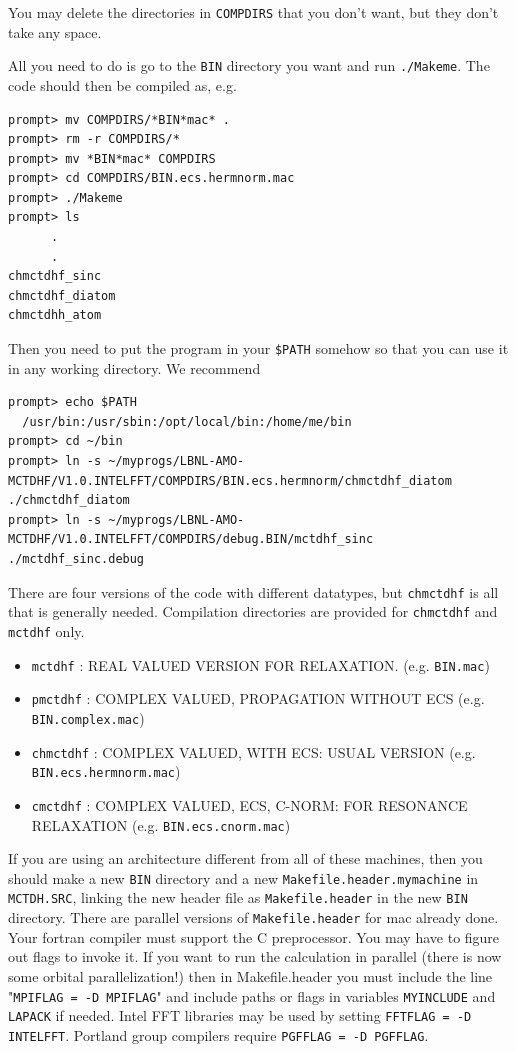 \documentclass[10pt,leqno, oneside]{book}
\begin{document}
You may delete the directories in \verb#COMPDIRS# that you don't want, but they don't take any space.

All you need to do is go to the \verb#BIN# directory you want and run \verb#./Makeme#.  The code should then be compiled as, e.g.
{\footnotesize
\begin{verbatim}
prompt> mv COMPDIRS/*BIN*mac* .
prompt> rm -r COMPDIRS/*
prompt> mv *BIN*mac* COMPDIRS
prompt> cd COMPDIRS/BIN.ecs.hermnorm.mac
prompt> ./Makeme
prompt> ls
      .
      .
chmctdhf_sinc
chmctdhf_diatom
chmctdhh_atom
\end{verbatim}}

Then you need to put the program in your \verb#$PATH# somehow so that you can use it in any working directory.  We recommend
{\footnotesize
\begin{verbatim}
prompt> echo $PATH
  /usr/bin:/usr/sbin:/opt/local/bin:/home/me/bin
prompt> cd ~/bin
prompt> ln -s ~/myprogs/LBNL-AMO-MCTDHF/V1.0.INTELFFT/COMPDIRS/BIN.ecs.hermnorm/chmctdhf_diatom ./chmctdhf_diatom
prompt> ln -s ~/myprogs/LBNL-AMO-MCTDHF/V1.0.INTELFFT/COMPDIRS/debug.BIN/mctdhf_sinc ./mctdhf_sinc.debug
\end{verbatim}}

There are four versions of the code with different datatypes, but \verb#chmctdhf# is all that is generally needed.  Compilation directories 
are provided for \verb#chmctdhf# and \verb#mctdhf# only.
\begin{itemize}
\item{\verb#mctdhf# : REAL VALUED VERSION FOR RELAXATION. (e.g. \verb#BIN.mac#) }
\item{ \verb#pmctdhf# : COMPLEX VALUED, PROPAGATION WITHOUT ECS (e.g. \verb#BIN.complex.mac#)}
\item{ \verb#chmctdhf# : COMPLEX VALUED, WITH ECS: USUAL VERSION (e.g. \verb#BIN.ecs.hermnorm.mac#)}  
\item{ \verb#cmctdhf# : COMPLEX VALUED, ECS, C-NORM: FOR RESONANCE RELAXATION (e.g. \verb#BIN.ecs.cnorm.mac#)}
\end{itemize}

If you are using an architecture different from all of these machines, then you should make a new \verb#BIN# directory and a new \verb#Makefile.header.mymachine#
in \verb#MCTDH.SRC#, linking the new header file as \verb#Makefile.header# in the new \verb#BIN# directory.
There are parallel versions of \verb#Makefile.header# for mac already done.
Your fortran compiler must support the C preprocessor.  You may have to figure out flags to invoke it.
If you want to run the calculation in parallel (there is now some orbital parallelization!)
then in Makefile.header 
you must include the line "\verb#MPIFLAG = -D MPIFLAG#"  and include
paths or flags in 
variables \verb#MYINCLUDE# and \verb#LAPACK# if needed.  Intel FFT libraries may be used by setting \verb#FFTFLAG = -D INTELFFT#.
Portland group compilers require \verb#PGFFLAG = -D PGFFLAG#.
\end{document}
